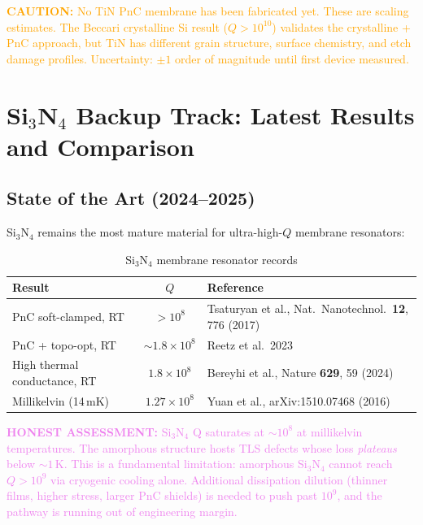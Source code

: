 \documentclass[11pt]{article}
\theoremstyle{remark}
\newcommand{\ee}[1]{\times 10^{#1}}
\newcommand{\caution}[1]{\textcolor{orange}{\textbf{CAUTION:} #1}}
\newcommand{\honest}[1]{\textcolor{violet}{\textbf{HONEST ASSESSMENT:} #1}}
\begin{document}
\caution{No TiN PnC membrane has been fabricated yet. These are
scaling estimates. The Beccari crystalline Si result ($Q > 10^{10}$)
validates the crystalline + PnC approach, but TiN has different
grain structure, surface chemistry, and etch damage profiles.
Uncertainty: $\pm 1$ order of magnitude until first device measured.}


\section{Si$_3$N$_4$ Backup Track: Latest Results and Comparison}
\label{sec:sin}

\subsection{State of the Art (2024--2025)}

Si$_3$N$_4$ remains the most mature material for ultra-high-$Q$
membrane resonators:

\begin{table}[H]
\centering
\caption{Si$_3$N$_4$ membrane resonator records}
\label{tab:SiN_records}
\begin{tabular}{@{}lcl@{}}
\toprule
Result & $Q$ & Reference \\
\midrule
PnC soft-clamped, RT & $> 10^8$ & Tsaturyan et al., Nat.\ Nanotechnol.\
  \textbf{12}, 776 (2017) \\
PnC + topo-opt, RT & $\sim 1.8\ee{8}$ & Reetz et al.\ 2023 \\
High thermal conductance, RT & $1.8\ee{8}$ & Bereyhi et al., Nature
  \textbf{629}, 59 (2024) \\
Millikelvin (14\,mK) & $1.27\ee{8}$ & Yuan et al.,
  arXiv:1510.07468 (2016) \\
\bottomrule
\end{tabular}
\end{table}

\honest{Si$_3$N$_4$ Q saturates at $\sim 10^8$ at millikelvin
temperatures. The amorphous structure hosts TLS defects whose loss
\emph{plateaus} below $\sim 1$\,K. This is a fundamental limitation:
amorphous Si$_3$N$_4$ cannot reach $Q > 10^9$ via cryogenic cooling
alone. Additional dissipation dilution (thinner films, higher stress,
larger PnC shields) is needed to push past $10^9$, and the pathway
is running out of engineering margin.}
\end{document}
